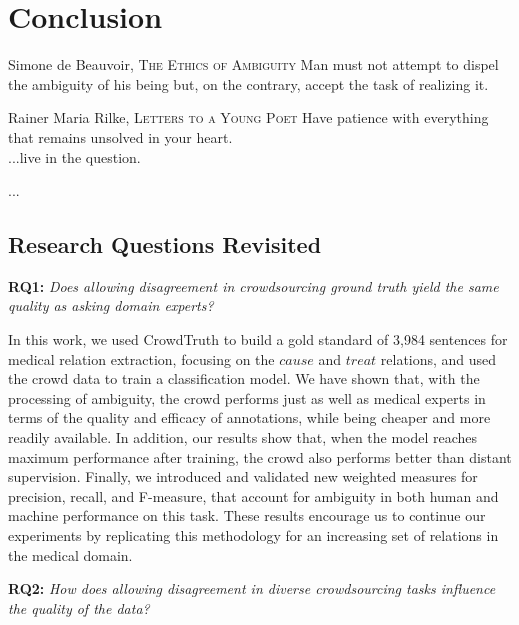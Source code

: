 %
\chapter{Conclusion}
\label{sec:conclusion}

\begin{chapquote}{Simone de Beauvoir, \textsc{The Ethics of Ambiguity}}
Man must not attempt to dispel the ambiguity of his being but, on the contrary, accept the task of realizing it.
\end{chapquote}

\begin{chapquote}{Rainer Maria Rilke, \textsc{Letters to a Young Poet}}
\noindent
Have patience with everything that remains unsolved in your heart. \\
...live in the question.
\end{chapquote}

...

\section{Research Questions Revisited}

\textbf{RQ1:} \textit{Does allowing disagreement in crowdsourcing ground truth yield the same quality as asking domain experts?}

In this work, we used CrowdTruth to build a gold standard of 3,984 sentences for medical relation extraction, focusing on the $cause$ and $treat$ relations, and used the crowd data to train a classification model. We have shown that, with the processing of ambiguity, the crowd performs just as well as medical experts in terms of the quality and efficacy of annotations, while being cheaper and more readily available. In addition, our results show that, when the model reaches maximum performance after training, the crowd also performs better than distant supervision. Finally, we introduced and validated new weighted measures for precision, recall, and F-measure, that account for ambiguity in both human and machine performance on this task. These results encourage us to continue our experiments by replicating this methodology for an increasing set of relations in the medical domain.

\textbf{RQ2:} \textit{How does allowing disagreement in diverse crowdsourcing tasks influence the quality of the data?}

